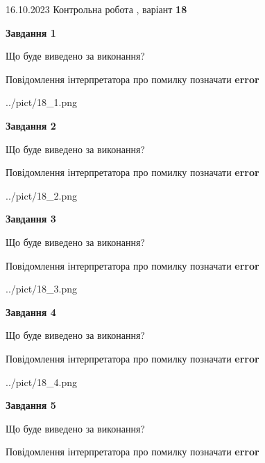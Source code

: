 \documentclass[12pt, ukrainian]{article}
\begin{document}
{\Large{16.10.2023 Контрольна робота , варіант  \No \textbf { 18 }\par}}
{
\begin {large}
{\begin {center}\textbf{Завдання 1}\end {center}}\par
Що буде виведено за виконання? \par
Повідомлення інтерпретатора про помилку позначати \textbf{error}

\begin{center}
	{../pict/18_1.png}
\end{center}
\newpage

{\begin {center}\textbf{Завдання 2}\end {center}}\par
Що буде виведено за виконання? \par
Повідомлення інтерпретатора про помилку позначати \textbf{error}

\begin{center}
	{../pict/18_2.png}
\end{center}
\newpage

{\begin {center}\textbf{Завдання 3}\end {center}}\par
Що буде виведено за виконання? \par
Повідомлення інтерпретатора про помилку позначати \textbf{error}

\begin{center}
	{../pict/18_3.png}
\end{center}
\newpage

{\begin {center}\textbf{Завдання 4}\end {center}}\par
Що буде виведено за виконання? \par
Повідомлення інтерпретатора про помилку позначати \textbf{error}

\begin{center}
	{../pict/18_4.png}
\end{center}
\newpage

{\begin {center}\textbf{Завдання 5}\end {center}}\par
Що буде виведено за виконання? \par
Повідомлення інтерпретатора про помилку позначати \textbf{error}


\end{large}}
\end{document}
